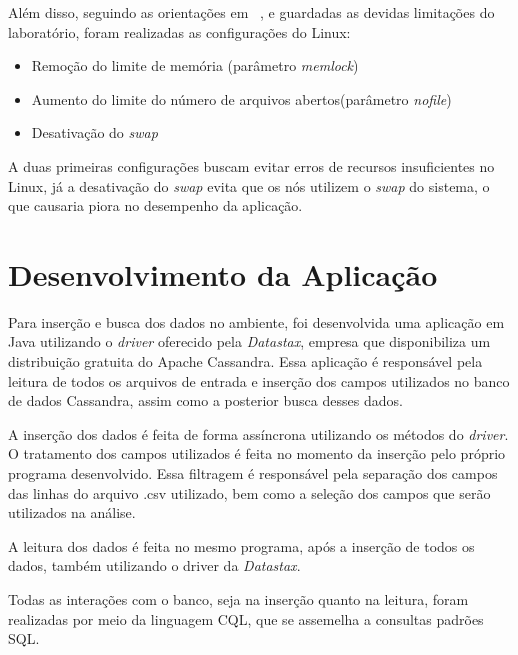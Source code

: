 Além disso, seguindo as orientações em ~\cite{cassandrasettings}, e guardadas as devidas limitações do laboratório, foram realizadas as configurações do Linux:
\begin{itemize}
	\item Remoção do limite de memória (parâmetro \emph{memlock})
	\item Aumento do limite do número de arquivos abertos(parâmetro \emph{nofile})
	\item Desativação do \emph{swap}
\end{itemize}

A duas primeiras configurações buscam evitar erros de recursos insuficientes no Linux, já a desativação do \emph{swap} evita que os nós utilizem o \emph{swap} do sistema, o que causaria piora no desempenho da aplicação.

\section{Desenvolvimento da Aplicação}
Para inserção e busca dos dados no ambiente, foi desenvolvida uma aplicação em Java utilizando o \emph{driver} oferecido pela \emph{Datastax}, empresa que disponibiliza um distribuição gratuita do Apache Cassandra. Essa aplicação é responsável pela leitura de todos os arquivos de entrada e inserção dos campos utilizados no banco de dados Cassandra, assim como a posterior busca desses dados.

A inserção dos dados é feita de forma assíncrona utilizando os métodos do \emph{driver}. O tratamento dos campos utilizados é feita no momento da inserção pelo próprio programa desenvolvido. Essa filtragem é responsável pela separação dos campos das linhas do arquivo .csv utilizado, bem como a seleção dos campos que serão utilizados na análise. 

A leitura dos dados é feita no mesmo programa, após a inserção de todos os dados, também utilizando o driver da \emph{Datastax}.

Todas as interações com o banco, seja na inserção quanto na leitura, foram realizadas por meio da linguagem CQL, que se assemelha a consultas padrões SQL.



